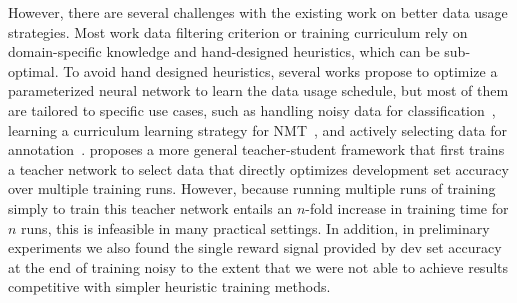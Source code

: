 However, there are several challenges with the existing work on better data usage strategies. Most work data filtering criterion or training curriculum rely on domain-specific knowledge and hand-designed heuristics, which can be sub-optimal. To avoid hand designed heuristics, several works propose to optimize a parameterized neural network to learn the data usage schedule, but most of them are tailored to specific use cases, such as handling noisy data for classification~\citep{mentornet}, learning a curriculum learning strategy for NMT~\citep{rl_nmt}, and actively selecting data for annotation~\citep{learn_active_learn,reinforce_cotrain}.
\cite{learn_to_teach} proposes a more general teacher-student framework that first trains a teacher network to select data that directly optimizes development set accuracy over multiple training runs.
However, because running multiple runs of training simply to train this teacher network entails an $n$-fold increase in training time for $n$ runs, this is infeasible in many practical settings.
In addition, in preliminary experiments we also found the single reward signal provided by dev set accuracy at the end of training noisy to the extent that we were not able to achieve results competitive with simpler heuristic training methods.


